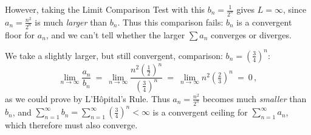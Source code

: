 \documentclass[11pt]{article}
\begin{document}
However, taking the Limit Comparison Test with this $b_n=\frac{1}{2^n}$ gives 
$L=\infty$, since $a_n=\frac{n^2}{2^n}$ is much {\it larger} than $b_n$.
Thus this comparison fails: 
$b_n$ is a convergent floor for $a_n$, and we can't tell whether the larger $\sum a_n$ converges or diverges.

We take a slightly larger, but still convergent, comparison: $b_n=\left(\frac 34\right)^{\!n}$:
$$
\lim_{n\to\infty} \frac{a_n}{b_n} 
\ =\ 
\lim_{n\to\infty}  \frac{ n^2\!\left(\frac12\right)^{\!n} } {\left(\frac 34\right)^{\!n} } 
\ =\ 
\lim_{n\to\infty} n^2 \!\left( \tfrac23 \right)^{\!n}
\ =\ 0\,,
$$
as we could prove by L'H\^opital's Rule. Thus $a_n=\frac{n^2}{2^n}$ becomes much {\it smaller}
than $b_n$, and $\sum_{n=1}^\infty b_n=\sum_{n=1}^\infty \left(\frac 34\right)^{\!n}<\infty$ is a
convergent ceiling for $\sum_{n=1}^\infty a_n$, which therefore must also converge.
\\[.5em]
\end{document}

